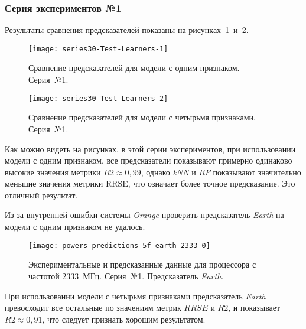 \subsubsection{Серия экспериментов №1}

Результаты сравнения предсказателей показаны на рисунках~\ref{img:series30-Test-Learners-1}~и~\ref{img:series30-Test-Learners-2}.

\begin{figure}[H]
    \begin{center}
            \texttt{[image: series30-Test-Learners-1]}
            \caption{Сравнение предсказателей для модели с одним признаком. Серия~№1.} %
            \label{img:series30-Test-Learners-1} %
    \end{center}
\end{figure}

\begin{figure}[H]
    \begin{center}
            \texttt{[image: series30-Test-Learners-2]}
            \caption{Сравнение предсказателей для модели с четырьмя признаками. Серия~№1.}
            \label{img:series30-Test-Learners-2}
    \end{center}
\end{figure}

Как можно видеть на рисунках, в этой серии экспериментов, при использовании модели с одним признаком, все предсказатели показывают примерно одинаково высокие значения метрики $R2 \approx 0,99$, однако \textit{kNN} и \textit{RF} показывают значительно меньшие значения метрики RRSE, что означает более точное предсказание. Это отличный результат.

Из-за внутренней ошибки системы \textit{Orange} проверить предсказатель \textit{Earth} на модели с одним признаком не удалось.

\begin{figure}[H]
    \begin{center}
        \texttt{[image: powers-predictions-5f-earth-2333-0]}
        \caption{Экспериментальные и предсказанные данные для процессора с частотой 2333~МГц. Серия~№1. Предсказатель \textit{Earth}.}
        \label{img:powers-predictions-5f-earth-2333-0}
    \end{center}
\end{figure}

При использовании модели с четырьмя признаками предсказатель \textit{Earth} превосходит все остальные по значениям метрик $RRSE$ и $R2$, и показывает $R2 \approx 0,91$, что следует признать хорошим результатом.

